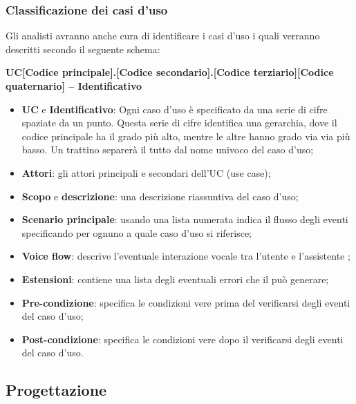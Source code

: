 \subsubsection{Classificazione dei casi d'uso}
Gli analisti avranno anche cura di identificare i casi d’uso i quali verranno descritti secondo il seguente schema:
\begin{center}
	\textbf{UC[Codice principale].[Codice secondario].[Codice terziario][Codice quaternario] – Identificativo}
\end{center}
\begin{itemize}
	\item \textbf{UC} e \textbf{Identificativo}: Ogni caso d’uso è specificato da una serie di cifre spaziate da un punto. Questa serie di cifre identifica una gerarchia, dove il codice principale ha il grado più alto, mentre le altre hanno grado via via più basso. Un trattino separerà il tutto dal nome univoco del caso d’uso;
	\item \textbf{Attori}: gli attori principali e secondari dell’UC (use case);
	\item \textbf{Scopo} e \textbf{descrizione}: una descrizione riassuntiva del caso d’uso;
	\item \textbf{Scenario principale}: usando una lista numerata indica il flusso degli eventi specificando per ognuno a quale caso d’uso si riferisce;
	\item \textbf{Voice flow}: descrive l'eventuale interazione vocale tra l'utente e l'assistente ;
	\item \textbf{Estensioni}: contiene una lista degli eventuali errori che il  può generare;
	\item \textbf{Pre-condizione}: specifica le condizioni vere prima del verificarsi degli eventi del caso d’uso;
	\item \textbf{Post-condizione}: specifica le condizioni vere dopo il verificarsi degli eventi del caso d’uso.
\end{itemize}
\subsection{Progettazione}
\label{sec:progettazione}
